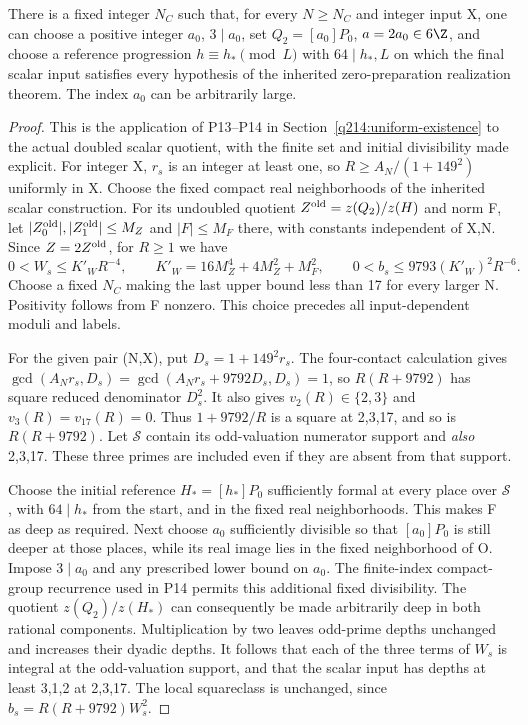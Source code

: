 \begin{proposition}\label{q198:scalar-preparation}
There is a fixed integer $N_C$ such that, for every $N\ge N_C$
and integer input X, one can choose a positive integer $a_0$,
$3\mid a_0$, set $Q_2=[a_0]P_0$, $a=2a_0\in6\Z$, and
choose a reference progression $h\equiv h_*\pmod L$ with
$64\mid h_*,L$ on which the final scalar input satisfies every
hypothesis of the inherited zero-preparation realization theorem.
The index $a_0$ can be arbitrarily large.
\end{proposition}
\begin{proof}
This is the application of P13--P14 in
Section~\ref{q214:uniform-existence} to the actual doubled scalar
quotient, with the finite set and initial divisibility made explicit.
For integer X, $r_s$ is an integer at least one, so
$R\ge A_N/(1+149^2)$ uniformly in X.
Choose the fixed compact real neighborhoods of the inherited
scalar construction. For its undoubled quotient
$Z^{\rm old}=z(Q_2)/z(H)$ and norm F, let
$|Z^{\rm old}_0|,|Z^{\rm old}_1|\le M_Z$ and $|F|\le M_F$
there, with constants independent of X,N.
Since $Z=2Z^{\rm old}$, for $R\ge1$ we have
\[
 0<W_s\le K'_W R^{-4},\qquad
 K'_W=16M_Z^4+4M_Z^2+M_F^2,\qquad
 0<b_s\le9793(K'_W)^2R^{-6}.
\]
Choose a fixed $N_C$ making the last upper bound less than 17
for every larger N. Positivity follows from F nonzero. This
choice precedes all input-dependent moduli and labels.

For the given pair (N,X), put $D_s=1+149^2r_s$.
The four-contact calculation gives
$\gcd(A_Nr_s,D_s)=\gcd(A_Nr_s+9792D_s,D_s)=1$,
so $R(R+9792)$ has square reduced denominator $D_s^2$.
It also gives $v_2(R)\in\{2,3\}$ and $v_3(R)=v_{17}(R)=0$.
Thus $1+9792/R$ is a square at 2,3,17, and so is $R(R+9792)$.
Let $\mathcal S$ contain its odd-valuation numerator support and
\emph{also} 2,3,17. These three primes are included even if they
are absent from that support.

Choose the initial reference $H_*=[h_*]P_0$ sufficiently formal
at every place over $\mathcal S$, with $64\mid h_*$ from the
start, and in the fixed real neighborhoods. This makes F as deep
as required. Next choose $a_0$ sufficiently divisible so that
$[a_0]P_0$ is still deeper at those places, while its real image
lies in the fixed neighborhood of O. Impose $3\mid a_0$ and
any prescribed lower bound on $a_0$. The finite-index compact-group
recurrence used in P14 permits this additional fixed divisibility.
The quotient $z(Q_2)/z(H_*)$ can consequently be made arbitrarily
deep in both rational components. Multiplication by two leaves
odd-prime depths unchanged and increases their dyadic depths.
It follows that each of the three terms of $W_s$ is integral at
the odd-valuation support, and that the scalar input has depths
at least 3,1,2 at 2,3,17. The local squareclass is unchanged,
since $b_s=R(R+9792)W_s^2$.


\end{proof}
